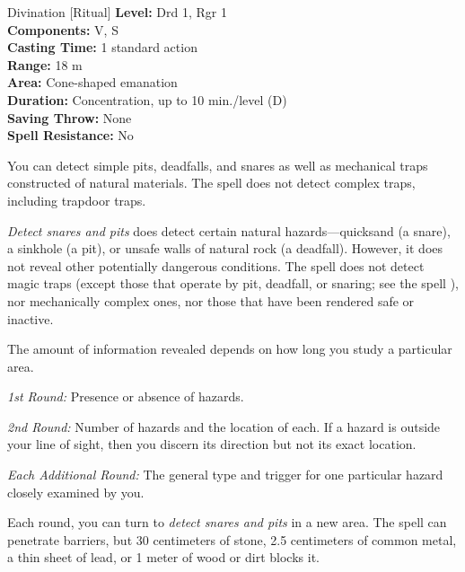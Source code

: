 {Divination [Ritual]}
{
	\textbf{Level:}
	Drd 1, Rgr 1\\
	\textbf{Components:}
	V, S\\
	\textbf{Casting Time:}
	1 standard action\\
	\textbf{Range:}
	18 m\\
	\textbf{Area:}
	Cone-shaped emanation\\
	\textbf{Duration:}
	Concentration, up to 10 min./level (D)\\
	\textbf{Saving Throw:}
	None\\
	\textbf{Spell Resistance:}
	No\\
}
{
	You can detect simple pits, deadfalls, and snares as well as mechanical traps constructed of natural materials. The spell does not detect complex traps, including trapdoor traps.

	\emph{Detect snares and pits} does detect certain natural hazards---quicksand (a snare), a sinkhole (a pit), or unsafe walls of natural rock (a deadfall). However, it does not reveal other potentially dangerous conditions. The spell does not detect magic traps (except those that operate by pit, deadfall, or snaring; see the spell ), nor mechanically complex ones, nor those that have been rendered safe or inactive.

	The amount of information revealed depends on how long you study a particular area.

	\textit{1st Round:}
	Presence or absence of hazards.

	\textit{2nd Round:}
	Number of hazards and the location of each. If a hazard is outside your line of sight, then you discern its direction but not its exact location.

	\textit{Each Additional Round:}
	The general type and trigger for one particular hazard closely examined by you.

	Each round, you can turn to \emph{detect snares and pits} in a new area. The spell can penetrate barriers, but 30 centimeters of stone, 2.5 centimeters of common metal, a thin sheet of lead, or 1 meter of wood or dirt blocks it.

}
